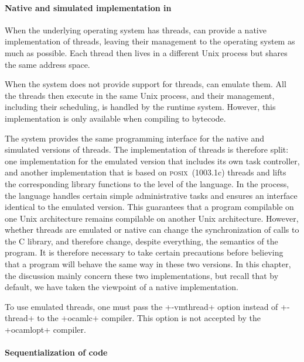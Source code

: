 \paragraph {\label{sec/thread-implementation}Native and simulated implementation in {\ocaml}}

When the underlying operating system has threads, {\ocaml} can provide
a native implementation of threads, leaving their management to the
operating system as much as possible.  Each thread then lives in a
different Unix process but shares the same address space.

When the system does not provide support for threads, {\ocaml} can
emulate them.  All the threads then execute in the same Unix process,
and their management, including their scheduling, is handled by the
{\ocaml} runtime system.  However, this implementation is only
available when compiling to bytecode.

The {\ocaml} system provides the same programming interface for the
native and simulated versions of threads. The implementation of
threads is therefore split: one implementation for the emulated
version that includes its own task controller, and another
implementation that is based on \textsc{posix}~(1003.1c) threads and
lifts the corresponding library functions to the level of the {\ocaml}
language.  In the process, the {\ocaml} language handles certain
simple administrative tasks and ensures an interface identical to the
emulated version.  This guarantees that a program compilable on one
Unix architecture remains compilable on another Unix architecture.
However, whether threads are emulated or native can change the
synchronization of calls to the C library, and therefore change,
despite everything, the semantics of the program.  It is therefore
necessary to take certain precautions before believing that a program
will behave the same way in these two versions.  In this chapter, the
discussion mainly concern these two implementations, but recall
that by default, we have taken the viewpoint of a native
implementation.

To use emulated threads, one must pass the \ml+-vmthread+ option
instead of \ml+-thread+ to the \ml+ocamlc+ compiler. This option is
not accepted by the \ml+ocamlopt+ compiler.

\paragraph{Sequentialization of {\ocaml} code}


